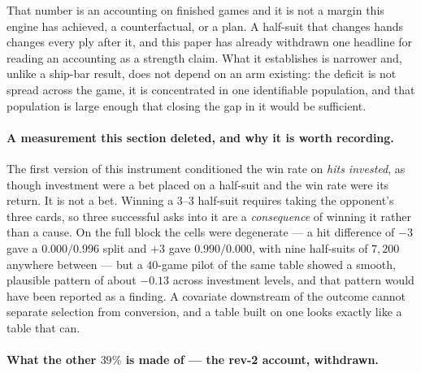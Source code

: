 \documentclass[11pt,letterpaper]{article}
\begin{document}
That number is an accounting on finished games and it is not a margin this
engine has achieved, a counterfactual, or a plan. A half-suit that changes
hands changes every ply after it, and this paper has already withdrawn one
headline for reading an accounting as a strength claim. What it establishes is
narrower and, unlike a ship-bar result, does not depend on an arm existing:
the deficit is not spread across the game, it is concentrated in one
identifiable population, and that population is large enough that closing the
gap in it would be sufficient.

\paragraph{A measurement this section deleted, and why it is worth recording.}
The first version of this instrument conditioned the win rate on \emph{hits
invested}, as though investment were a bet placed on a half-suit and the win
rate were its return. It is not a bet. Winning a $3$--$3$ half-suit requires
taking the opponent's three cards, so three successful asks into it are a
\emph{consequence} of winning it rather than a cause. On the full block the
cells were degenerate --- a hit difference of $-3$ gave a $0.000/0.996$ split
and $+3$ gave $0.990/0.000$, with nine half-suits of $7{,}200$ anywhere
between --- but a $40$-game pilot of the same table showed a smooth,
plausible pattern of about $-0.13$ across investment levels, and that pattern
would have been reported as a finding. A covariate downstream of the outcome
cannot separate selection from conversion, and a table built on one looks
exactly like a table that can.

\paragraph{What the other $39\%$ is made of --- the rev-2 account, withdrawn.}
\end{document}
